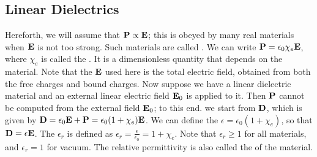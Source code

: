 \subsection{Linear Dielectrics}
Hereforth, we will assume that $\mathbf{P} \propto \mathbf{E}$; this is obeyed by many real materials when $\mathbf{E}$ is not too strong. Such materials are called . We can write $\mathbf{P} = \epsilon_{0} \chi_{e} \mathbf{E}$, where $\chi_{e}$ is called the . It is a dimensionless quantity that depends on the material. Note that the $\mathbf{E}$ used here is the total electric field, obtained from both the free charges and bound charges. Now suppose we have a linear dielectric material and an external linear electric field $\mathbf{E}_{0}$ is applied to it. Then $\mathbf{P}$ cannot be computed from the external field $\mathbf{E}_{0}$; to this end. we start from $\mathbf{D}$, which is given by $\mathbf{D} = \epsilon_{0} \mathbf{E} + \mathbf{P} = \epsilon_{0} (1 + \chi_{e}) \mathbf{E}$. We can define the  $\epsilon = \epsilon_{0} (1 + \chi_{e})$, so that $\mathbf{D} = \epsilon \mathbf{E}$. The  $\epsilon_{r}$ is defined as $\epsilon_{r} = \frac{\epsilon}{\epsilon_{0}} = 1 + \chi_{e}$. Note that $\epsilon_{r} \geq 1$ for all materials, and $\epsilon_{r} = 1$ for vacuum. The relative permittivity is also called the  of the material.

